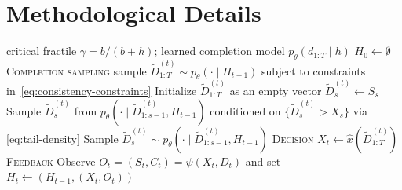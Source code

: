 \documentclass[11pt]{article}
\begin{document}
\newcommand{\Ind}{\mathbf{1}} 









\section{Methodological Details}

\begin{algorithm}[h]
\caption{In-context Generative Posterior Sampling (GPS) for right-censored newsvendor}
\label{alg:nv-gps}
\small
\begin{algorithmic}[1]
\Require critical fractile $\gamma=b/(b+h)$; learned completion model $p_\theta(d_{1:T}\mid h)$
\State $H_0 \gets \emptyset$
  \State \textsc{Completion sampling} sample $\widetilde D_{1:T}^{(t)} \sim p_\theta(\cdot\mid H_{t-1})$ subject to constraints in~\eqref{eq:consistency-constraints}
  \State Initialize $\widetilde D_{1:T}^{(t)}$ as an empty vector
      \State $\widetilde D_s^{(t)} \gets S_s$ 
      \State Sample $\widetilde D_s^{(t)}$ from $p_\theta(\cdot\mid \widetilde D_{1:s-1}^{(t)},H_{t-1})$
      conditioned on $\{\widetilde D_s^{(t)} > X_s\}$ via \eqref{eq:tail-density}
    \Else
      \State Sample $\widetilde D_s^{(t)} \sim p_\theta(\cdot\mid \widetilde D_{1:s-1}^{(t)},H_{t-1})$
    \EndIf
  \EndFor
  \State \textsc{Decision} $X_t \gets \hat x(\widetilde D_{1:T}^{(t)})$
  \State \textsc{Feedback} Observe $O_t=(S_t,C_t)=\psi(X_t,D_t)$ and set $H_t\gets(H_{t-1},(X_t,O_t))$
\EndFor
\end{algorithmic}
\end{algorithm}
\end{document}

